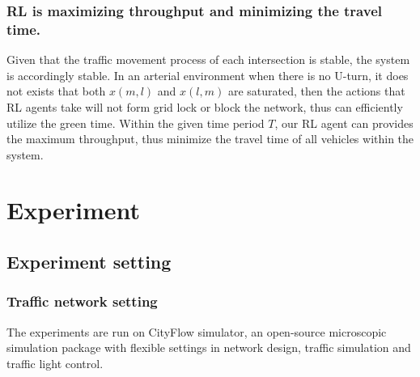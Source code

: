 \subsubsection{RL is maximizing throughput and minimizing the travel time.} Given that the traffic movement process of each intersection is stable, the system is accordingly stable. In an arterial environment when there is no U-turn, it does not exists that both $x(m,l)$ and $x(l,m)$ are saturated, then the actions that RL agents take will not form grid lock or block the network, thus can efficiently utilize the green time. Within the given time period $T$, our RL agent can provides the maximum throughput, thus minimize the travel time of all vehicles within the system.






\section{Experiment}

\subsection{Experiment setting}


\subsubsection{Traffic network setting}
The experiments are run on CityFlow simulator, an open-source microscopic simulation package with flexible settings in network design, traffic simulation and traffic light control. 



